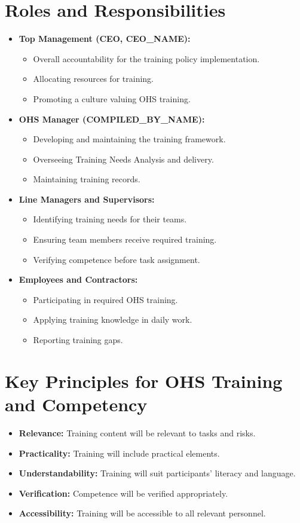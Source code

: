 \documentclass[12pt]{article}
\begin{document}
\section{Roles and Responsibilities}
\begin{itemize}
    \item \textbf{Top Management (CEO, {{CEO_NAME}}):}
    \begin{itemize}
        \item Overall accountability for the training policy implementation.
        \item Allocating resources for training.
        \item Promoting a culture valuing OHS training.
    \end{itemize}
    \item \textbf{OHS Manager ({{COMPILED_BY_NAME}}):}
    \begin{itemize}
        \item Developing and maintaining the training framework.
        \item Overseeing Training Needs Analysis and delivery.
        \item Maintaining training records.
    \end{itemize}
    \item \textbf{Line Managers and Supervisors:}
    \begin{itemize}
        \item Identifying training needs for their teams.
        \item Ensuring team members receive required training.
        \item Verifying competence before task assignment.
    \end{itemize}
    \item \textbf{Employees and Contractors:}
    \begin{itemize}
        \item Participating in required OHS training.
        \item Applying training knowledge in daily work.
        \item Reporting training gaps.
    \end{itemize}
\end{itemize}

\section{Key Principles for OHS Training and Competency}
\begin{itemize}
    \item \textbf{Relevance:} Training content will be relevant to tasks and risks.
    \item \textbf{Practicality:} Training will include practical elements.
    \item \textbf{Understandability:} Training will suit participants’ literacy and language.
    \item \textbf{Verification:} Competence will be verified appropriately.
    \item \textbf{Accessibility:} Training will be accessible to all relevant personnel.
\end{itemize}
\end{document}
